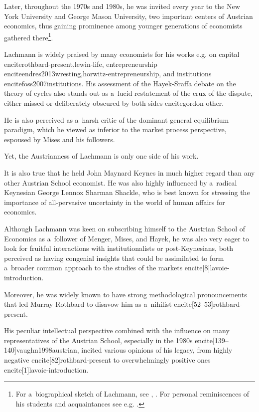 {Later, throughout the 1970s and 1980s, he was invited every year to the New York University and George Mason University, two important centers of Austrian economics, thus gaining prominence among younger generations of economists gathered there\footnote{For a~biographical sketch of Lachmann, see \textcite{mittenmaier}, \textcite{lewin-life}. For personal reminiscences of his students and acquaintances see e.g. \textcite{reminiscences,caldwell,boehm,boehm2000professor}.}.



Lachmann is widely praised by many economists for his works e.g. on capital encite{rothbard-present,lewin-life}, entrepreneurship encite{endres2013wresting,horwitz-entrepreneurship}, and institutions encite{foss2007institutions}. His assessment of the Hayek-Sraffa debate on the theory of cycles also stands out as a~lucid restatement of the crux of the dispute, either missed or deliberately obscured by both sides encite{gordon-other}.

He is also perceived as a~harsh critic of the dominant general equilibrium paradigm, which he viewed as inferior to the market process perspective, espoused by Mises and his followers.



Yet, the Austrianness of Lachmann is only one side of his work.

It is also true that he held John Maynard Keynes in much higher regard than any other Austrian School economist. He was also highly influenced by a~radical Keynesian George Lennox Sharman Shackle, who is best known for stressing the importance of all-pervasive uncertainty in the world of human affairs for economics.

Although Lachmann was keen on subscribing himself to the Austrian School of Economics as a~follower of Menger, Mises, and Hayek, he was also very eager to look for fruitful interactions with institutionalists or post-Keynesians, both perceived as having congenial insights that could be assimilated to form a~broader common approach to the studies of the markets encite[8]{lavoie-introduction}.

Moreover, he was widely known to have strong methodological pronouncements that led Murray Rothbard to disavow him as a~nihilist encite[52--53]{rothbard-present}.



His peculiar intellectual perspective combined with the influence on many representatives of the Austrian School, especially in the 1980s encite[139--140]{vaughn1998austrian}, incited various opinions of his legacy, from highly negative encite[82]{rothbard-present} to overwhelmingly positive ones encite[1]{lavoie-introduction}.

}
